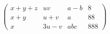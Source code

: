 \documentclass{article}
\begin{document}
\begin{displaymath}
    \left(
        \begin{array}{clcr}
            x+y+z & uv    & a-b & 8\\
            x+y   & u+v   & a   & 88\\
            x     & 3u-v & abc &888
        \end{array}\right
    )
\end{displaymath}
    
\end{document}
